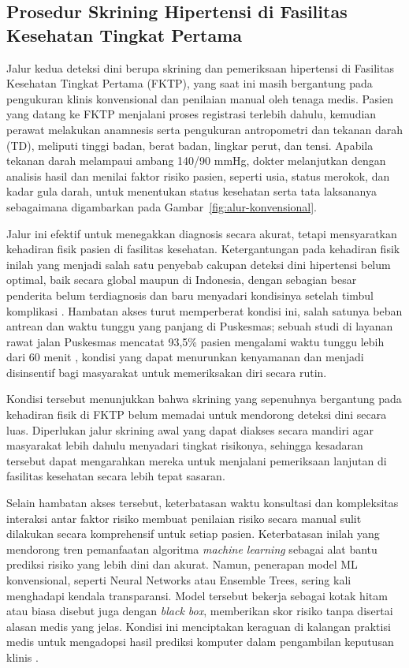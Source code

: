\subsection{Prosedur Skrining Hipertensi di Fasilitas Kesehatan Tingkat Pertama}
Jalur kedua deteksi dini berupa skrining dan pemeriksaan hipertensi di Fasilitas Kesehatan Tingkat Pertama (FKTP), yang saat ini masih bergantung pada pengukuran klinis konvensional dan penilaian manual oleh tenaga medis. Pasien yang datang ke FKTP menjalani proses registrasi terlebih dahulu, kemudian perawat melakukan anamnesis serta pengukuran antropometri dan tekanan darah (TD), meliputi tinggi badan, berat badan, lingkar perut, dan tensi. Apabila tekanan darah melampaui ambang 140/90 mmHg, dokter melanjutkan dengan analisis hasil dan menilai faktor risiko pasien, seperti usia, status merokok, dan kadar gula darah, untuk menentukan status kesehatan serta tata laksananya sebagaimana digambarkan pada Gambar~\ref{fig:alur-konvensional}.

Jalur ini efektif untuk menegakkan diagnosis secara akurat, tetapi mensyaratkan kehadiran fisik pasien di fasilitas kesehatan. Ketergantungan pada kehadiran fisik inilah yang menjadi salah satu penyebab cakupan deteksi dini hipertensi belum optimal, baik secara global \autocite{Mills2020Global} maupun di Indonesia, dengan sebagian besar penderita belum terdiagnosis dan baru menyadari kondisinya setelah timbul komplikasi \autocite{ri2018}. Hambatan akses turut memperberat kondisi ini, salah satunya beban antrean dan waktu tunggu yang panjang di Puskesmas; sebuah studi di layanan rawat jalan Puskesmas mencatat 93,5\% pasien mengalami waktu tunggu lebih dari 60 menit \autocite{Manyering2023}, kondisi yang dapat menurunkan kenyamanan dan menjadi disinsentif bagi masyarakat untuk memeriksakan diri secara rutin.

Kondisi tersebut menunjukkan bahwa skrining yang sepenuhnya bergantung pada kehadiran fisik di FKTP belum memadai untuk mendorong deteksi dini secara luas. Diperlukan jalur skrining awal yang dapat diakses secara mandiri agar masyarakat lebih dahulu menyadari tingkat risikonya, sehingga kesadaran tersebut dapat mengarahkan mereka untuk menjalani pemeriksaan lanjutan di fasilitas kesehatan secara lebih tepat sasaran.

Selain hambatan akses tersebut, keterbatasan waktu konsultasi dan kompleksitas interaksi antar faktor risiko membuat penilaian risiko secara manual sulit dilakukan secara komprehensif untuk setiap pasien. Keterbatasan inilah yang mendorong tren pemanfaatan algoritma \textit{machine learning} sebagai alat bantu prediksi risiko yang lebih dini dan akurat. Namun, penerapan model ML konvensional, seperti Neural Networks atau Ensemble Trees, sering kali menghadapi kendala transparansi. Model tersebut bekerja sebagai kotak hitam atau biasa disebut juga dengan \textit{black box}, memberikan skor risiko tanpa disertai alasan medis yang jelas. Kondisi ini menciptakan keraguan di kalangan praktisi medis untuk mengadopsi hasil prediksi komputer dalam pengambilan keputusan klinis \autocite{Amann2020Explainability}.

